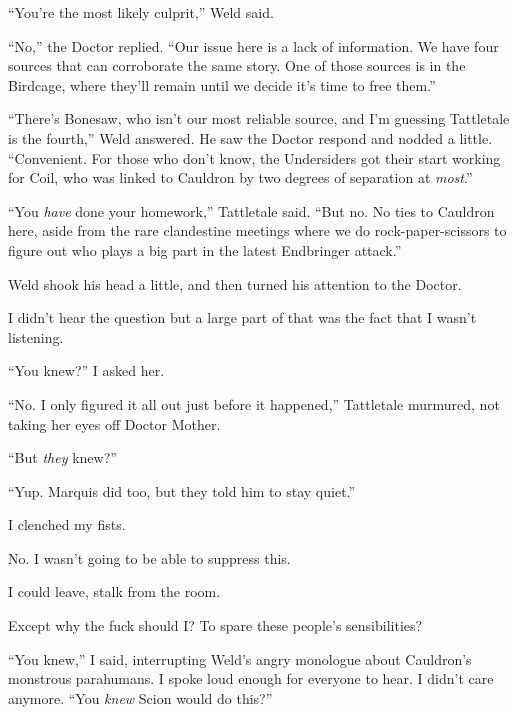 ``You're the most likely culprit,'' Weld said.



``No,'' the Doctor replied.  ``Our issue here is a lack of information.  We have four sources that can corroborate the same story.  One of those sources is in the Birdcage, where they'll remain until we decide it's time to free them.''



``There's Bonesaw, who isn't our most reliable source, and I'm guessing Tattletale is the fourth,'' Weld answered.  He saw the Doctor respond and nodded a little.  ``Convenient.  For those who don't know, the Undersiders got their start working for Coil, who was linked to Cauldron by two degrees of separation at \emph{most}.''



``You \emph{have} done your homework,'' Tattletale said.  ``But no.  No ties to Cauldron here, aside from the rare clandestine meetings where we do rock-paper-scissors to figure out who plays a big part in the latest Endbringer attack.''



Weld shook his head a little, and then turned his attention to the Doctor.



I didn't hear the question but a large part of that was the fact that I wasn't listening.



``You knew?'' I asked her.



``No.  I only figured it all out just before it happened,'' Tattletale murmured, not taking her eyes off Doctor Mother.



``But \emph{they} knew?''



``Yup.  Marquis did too, but they told him to stay quiet.''



I clenched my fists.



No.  I wasn't going to be able to suppress this.



I could leave, stalk from the room.



Except why the fuck should I?  To spare these people's sensibilities?



``You knew,'' I said, interrupting Weld's angry monologue about Cauldron's monstrous parahumans.  I spoke loud enough for everyone to hear.  I didn't care anymore.  ``You \emph{knew} Scion would do this?''



